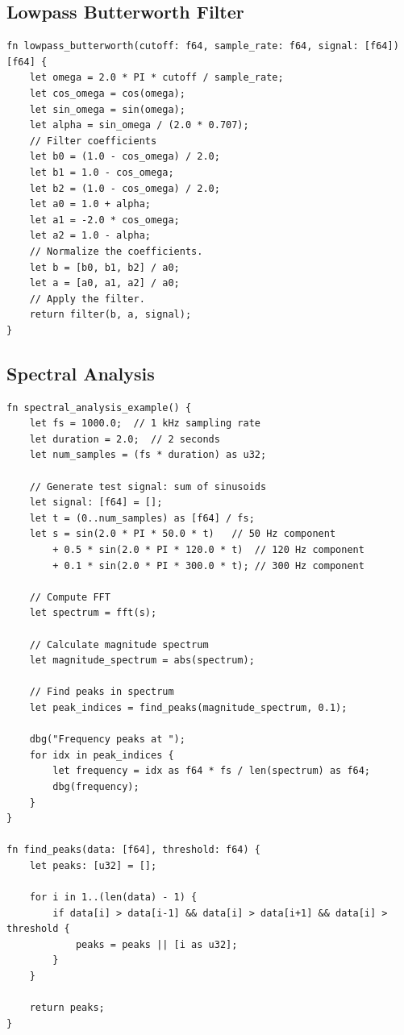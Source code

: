 \subsection{Lowpass Butterworth Filter}
\begin{verbatim}
fn lowpass_butterworth(cutoff: f64, sample_rate: f64, signal: [f64]) [f64] {
    let omega = 2.0 * PI * cutoff / sample_rate;
    let cos_omega = cos(omega);
    let sin_omega = sin(omega);
    let alpha = sin_omega / (2.0 * 0.707);
    // Filter coefficients
    let b0 = (1.0 - cos_omega) / 2.0;
    let b1 = 1.0 - cos_omega;
    let b2 = (1.0 - cos_omega) / 2.0;
    let a0 = 1.0 + alpha;
    let a1 = -2.0 * cos_omega;
    let a2 = 1.0 - alpha;
    // Normalize the coefficients.
    let b = [b0, b1, b2] / a0;
    let a = [a0, a1, a2] / a0;
    // Apply the filter.
    return filter(b, a, signal);
}
\end{verbatim}
\subsection{Spectral Analysis}
\begin{verbatim}
fn spectral_analysis_example() {
    let fs = 1000.0;  // 1 kHz sampling rate
    let duration = 2.0;  // 2 seconds
    let num_samples = (fs * duration) as u32;
    
    // Generate test signal: sum of sinusoids
    let signal: [f64] = [];
    let t = (0..num_samples) as [f64] / fs;
    let s = sin(2.0 * PI * 50.0 * t)   // 50 Hz component
        + 0.5 * sin(2.0 * PI * 120.0 * t)  // 120 Hz component
        + 0.1 * sin(2.0 * PI * 300.0 * t); // 300 Hz component

    // Compute FFT
    let spectrum = fft(s);
    
    // Calculate magnitude spectrum
    let magnitude_spectrum = abs(spectrum);
    
    // Find peaks in spectrum
    let peak_indices = find_peaks(magnitude_spectrum, 0.1);

    dbg("Frequency peaks at ");
    for idx in peak_indices {
        let frequency = idx as f64 * fs / len(spectrum) as f64;
        dbg(frequency);
    }
}

fn find_peaks(data: [f64], threshold: f64) {
    let peaks: [u32] = [];
    
    for i in 1..(len(data) - 1) {
        if data[i] > data[i-1] && data[i] > data[i+1] && data[i] > threshold {
            peaks = peaks || [i as u32];
        }
    }
    
    return peaks;
}
\end{verbatim}
